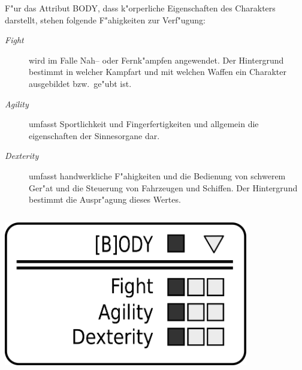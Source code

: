 \begin{column}[l]{0.55}
    F"ur das Attribut BODY, dass k"orperliche Eigenschaften des Charakters darstellt, stehen folgende F"ahigkeiten zur Verf"ugung:

    \begin{description}
        \item[\emph{Fight}] wird im Falle Nah-- oder Fernk"ampfen angewendet. Der Hintergrund bestimmt in welcher Kampfart und mit welchen 
            Waffen ein Charakter ausgebildet bzw.~ge"ubt ist.
        \item[\emph{Agility}] umfasst Sportlichkeit und Fingerfertigkeiten und allgemein die eigenschaften der Sinnesorgane dar.
        \item[\emph{Dexterity}] umfasst handwerkliche F"ahigkeiten und die Bedienung von schwerem Ger"at und  die Steuerung von Fahrzeugen 
            und Schiffen. Der Hintergrund bestimmt die Auspr"agung dieses Wertes.
    \end{description}
\end{column}
\begin{column}[r]{0.45}
    \centering
    \includegraphics[width=0.80\textwidth]{images/character_body}
\end{column}

